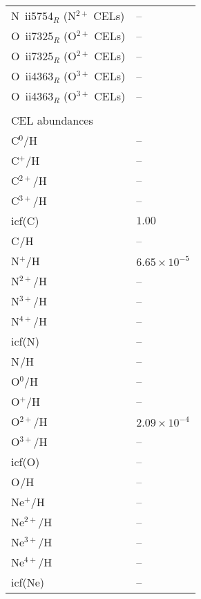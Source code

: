\begin{longtable}[l]{ll}
 N~{\sc ii}5754$_R$ (N$^{2+}$ CELs)  & -- \\
 O~{\sc ii}7325$_R$ (O$^{2+}$ CELs)  & -- \\
 O~{\sc ii}7325$_R$ (O$^{2+}$ CELs)  & -- \\
 O~{\sc ii}4363$_R$ (O$^{3+}$ CELs)  & -- \\
 O~{\sc ii}4363$_R$ (O$^{3+}$ CELs)  & -- \\
 \vspace{0.2cm}\\\multicolumn{2}{l}{CEL abundances}\\ \hline
 C$^{0}$/H                           & -- \\
 C$^{+}$/H                           & -- \\
 C$^{2+}$/H                          & -- \\
 C$^{3+}$/H                          & -- \\
 icf(C)                              & $  1.00$\\
 C$^{}$/H                            & -- \\
 N$^{+}$/H                           & $  6.65\times 10^{ -5}$\\
 N$^{2+}$/H                          & -- \\
 N$^{3+}$/H                          & -- \\
 N$^{4+}$/H                          & -- \\
 icf(N)                              & -- \\
 N$^{}$/H                            & -- \\
 O$^{0}$/H                           & -- \\
 O$^{+}$/H                           & -- \\
 O$^{2+}$/H                          & $  2.09\times 10^{ -4}$\\
 O$^{3+}$/H                          & -- \\
 icf(O)                              & -- \\
 O$^{}$/H                            & -- \\
 Ne$^{+}$/H                          & -- \\
 Ne$^{2+}$/H                         & -- \\
 Ne$^{3+}$/H                         & -- \\
 Ne$^{4+}$/H                         & -- \\
 icf(Ne)                             & -- \\

\end{longtable}
